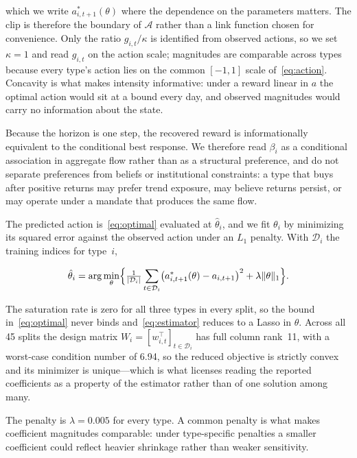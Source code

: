 \documentclass[sigconf,anonymous,review]{acmart}
\begin{document}
which we write $a^{*}_{i,t+1}(\theta)$ where the dependence on the
parameters matters. The clip is therefore the boundary of $\mathcal{A}$
rather than a link function chosen for convenience. Only the ratio
$g_{i,t}/\kappa$ is identified from observed actions, so we set
$\kappa = 1$ and read $g_{i,t}$ on the action scale; magnitudes are
comparable across types because every type's action lies on the common
$[-1,1]$ scale of~\eqref{eq:action}. Concavity is what makes intensity
informative: under a reward linear in $a$ the optimal action would sit at
a bound every day, and observed magnitudes would carry no information
about the state.

Because the horizon is one step, the recovered reward is informationally
equivalent to the conditional best response. We therefore read $\beta_i$
as a conditional association in aggregate flow rather than as a
structural preference, and do not separate preferences from beliefs or
institutional constraints: a type that buys after positive returns may
prefer trend exposure, may believe returns persist, or may operate under
a mandate that produces the same flow.

The predicted action is~\eqref{eq:optimal} evaluated at $\hat\theta_i$,
and we fit $\theta_i$ by minimizing its squared error against the
observed action under an $L_1$ penalty. With $\mathcal{D}_i$ the training
indices for type~$i$,

\begin{equation}
  \label{eq:estimator}
  \hat\theta_i = \arg\min_{\theta}
  \Bigl\{ \tfrac{1}{|\mathcal{D}_i|}
    \sum_{t \in \mathcal{D}_i}
      \bigl( a^{*}_{i,t+1}(\theta) - a_{i,t+1} \bigr)^2
    + \lambda \lVert \theta \rVert_1 \Bigr\}.
\end{equation}

The saturation rate is zero for all three types in every split, so the
bound in~\eqref{eq:optimal} never binds and~\eqref{eq:estimator} reduces
to a Lasso in $\theta$. Across all 45 splits the design matrix
$W_i = [w_{i,t}^{\top}]_{t \in \mathcal{D}_i}$ has full column rank~11,
with a worst-case condition number of 6.94, so the reduced objective is
strictly convex and its minimizer is unique---which is what licenses
reading the reported coefficients as a property of the estimator rather
than of one solution among many.

The penalty is $\lambda = 0.005$ for every type. A common penalty is what
makes coefficient magnitudes comparable: under type-specific penalties a
smaller coefficient could reflect heavier shrinkage rather than weaker
sensitivity.
\end{document}
